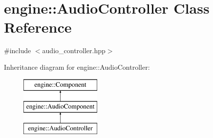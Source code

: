 \hypertarget{classengine_1_1_audio_controller}{}\section{engine\+:\+:Audio\+Controller Class Reference}
\label{classengine_1_1_audio_controller}


{\ttfamily \#include $<$audio\+\_\+controller.\+hpp$>$}

Inheritance diagram for engine\+:\+:Audio\+Controller\+:\begin{figure}[H]
\begin{center}
\leavevmode
\includegraphics[height=3.000000cm]{classengine_1_1_audio_controller}
\end{center}
\end{figure}
